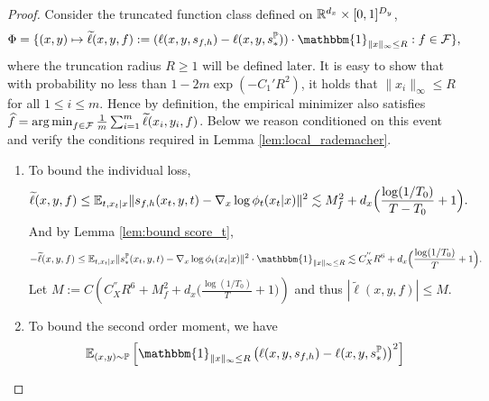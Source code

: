 \documentclass[11pt]{article}
\numberwithin{equation}{section}
\renewcommand{\P}{\mathbb{P}}
\begin{document}
\begin{proof}
    Consider the truncated function class defined on $\mathbb{R}^{d_x}\times[0,1]^{D_y}$,
    \begin{equation}
        \Phi=\{(x,y)\mapsto \widetilde{\ell}(x,y,f):=(\ell(x,y,s_{f,h})-\ell(x,y,s_*^\P))\cdot\mathbbm{1}_{\|x\|_\infty\leq R}:f\in\mathcal{F}\},
    \end{equation}
    where the truncation radius $R\geq 1$ will be defined later.
    It is easy to show that with probability no less than $1-2m\exp(-C_1'R^2)$, it holds that $\|x_i\|_\infty\leq R$ for all $1\leq i \leq m$.
    Hence by definition, the empirical minimizer also satisfies $\widehat{f}= \operatorname*{arg\,min}_{f\in\mathcal{F}} \frac{1}{m}\sum_{i=1}^m \widetilde{\ell}(x_i,y_i,f)$.
    Below we reason conditioned on this event and verify the conditions required in Lemma \ref{lem:local_rademacher}. 
    \begin{enumerate}[label=\textbf{Step \arabic*.}]
        \item To bound the individual loss,
        \begin{equation}
            \begin{aligned}
                \widetilde{\ell}(x,y,f)
                \leq \mathbb{E}_{t,x_t|x}\|s_{f,h}(x_t,y,t)-\nabla_x\log \phi_t(x_t|x)\|^2
                \lesssim M_f^2+ d_x\Big(\frac{\log(1/T_0)}{T-T_0}+1\Big). 
            \end{aligned}
        \end{equation}
        And by Lemma \ref{lem:bound score_t},
        \begin{equation}
            \begin{aligned}
                -\widetilde{\ell}(x,y,f)
                \leq \E_{t,x_t|x}\|s_*^\P(x_t,y,t)-\nabla_x\log \phi_t(x_t|x)\|^2\cdot \mathbbm{1}_{\|x\|_\infty\leq R}
                \lesssim C_X^{''}R^6+ d_x\Big(\frac{\log(1/T_0)}{T}+1\Big). 
            \end{aligned}
        \end{equation}
        Let $M:=C\left(C_X^{''}R^6+M_f^2+d_x\Big(\frac{\log(1/T_0)}{T}+1\Big)\right)$ and thus $|\widetilde{\ell}(x,y,f)|\leq M$.
        \item To bound the second order moment, we have
            \begin{equation}
                \begin{aligned}
                    &\E_{(x,y)\sim\P} \left[\mathbbm{1}_{\|x\|_\infty\leq R} \left(\ell(x,y,s_{f,h})-\ell(x,y,s_*^\P)\right)^2\right] \\

\end{aligned}
\end{equation}
\end{enumerate}
\end{proof}
\end{document}
